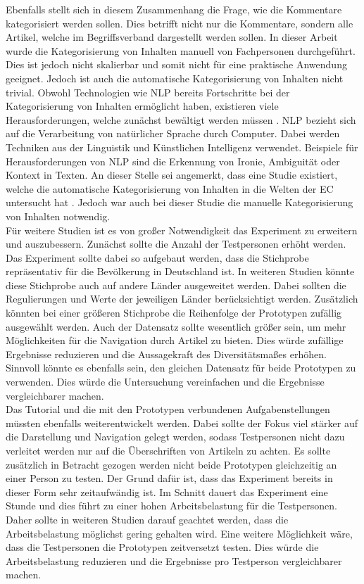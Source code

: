 Ebenfalls stellt sich in diesem Zusammenhang die Frage, wie die Kommentare kategorisiert werden sollen.
Dies betrifft nicht nur die Kommentare, sondern alle Artikel, welche im Begriffsverband dargestellt werden sollen.
In dieser Arbeit wurde die Kategorisierung von Inhalten manuell von Fachpersonen durchgeführt.
Dies ist jedoch nicht skalierbar und somit nicht für eine praktische Anwendung geeignet.
Jedoch ist auch die automatische Kategorisierung von Inhalten nicht trivial.
Obwohl Technologien wie \ac{NLP} bereits Fortschritte bei der Kategorisierung von Inhalten ermöglicht haben, existieren viele Herausforderungen, welche zunächst bewältigt werden müssen \cite{nlp}.
\ac{NLP} bezieht sich auf die Verarbeitung von natürlicher Sprache durch Computer.
Dabei werden Techniken aus der Linguistik und Künstlichen Intelligenz verwendet.
Beispiele für Herausforderungen von \ac{NLP} sind die Erkennung von Ironie, Ambiguität oder Kontext in Texten.
An dieser Stelle sei angemerkt, dass eine Studie existiert, welche die automatische Kategorisierung von Inhalten in die Welten der \ac{EC} untersucht hat \cite{solans}.
Jedoch war auch bei dieser Studie die manuelle Kategorisierung von Inhalten notwendig. \\

Für weitere Studien ist es von großer Notwendigkeit das Experiment zu erweitern und auszubessern.
Zunächst sollte die Anzahl der Testpersonen erhöht werden.
Das Experiment sollte dabei so aufgebaut werden, dass die Stichprobe repräsentativ für die Bevölkerung in Deutschland ist.
In weiteren Studien könnte diese Stichprobe auch auf andere Länder ausgeweitet werden.
Dabei sollten die Regulierungen und Werte der jeweiligen Länder berücksichtigt werden.
Zusätzlich könnten bei einer größeren Stichprobe die Reihenfolge der Prototypen zufällig ausgewählt werden.
Auch der Datensatz sollte wesentlich größer sein, um mehr Möglichkeiten für die Navigation durch Artikel zu bieten.
Dies würde zufällige Ergebnisse reduzieren und die Aussagekraft des Diversitätsmaßes erhöhen.
Sinnvoll könnte es ebenfalls sein, den gleichen Datensatz für beide Prototypen zu verwenden.
Dies würde die Untersuchung vereinfachen und die Ergebnisse vergleichbarer machen.\\

Das Tutorial und die mit den Prototypen verbundenen Aufgabenstellungen müssten ebenfalls weiterentwickelt werden.
Dabei sollte der Fokus viel stärker auf die Darstellung und Navigation gelegt werden, sodass Testpersonen nicht dazu verleitet werden nur auf die Überschriften von Artikeln zu achten.
Es sollte zusätzlich in Betracht gezogen werden nicht beide Prototypen gleichzeitig an einer Person zu testen.
Der Grund dafür ist, dass das Experiment bereits in dieser Form sehr zeitaufwändig ist.
Im Schnitt dauert das Experiment eine Stunde und dies führt zu einer hohen Arbeitsbelastung für die Testpersonen.
Daher sollte in weiteren Studien darauf geachtet werden, dass die Arbeitsbelastung möglichst gering gehalten wird.
Eine weitere Möglichkeit wäre, dass die Testpersonen die Prototypen zeitversetzt testen.
Dies würde die Arbeitsbelastung reduzieren und die Ergebnisse pro Testperson vergleichbarer machen.\\
